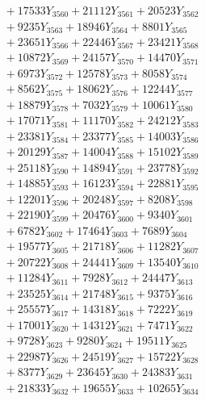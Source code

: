 \documentclass[a4paper,10pt]{article}
\begin{document}
{\begin{align}
&\;  + 17533 Y_{3560} + 21112 Y_{3561} + 20523 Y_{3562} \\[0.3ex]
&\;  + 9235 Y_{3563} + 18946 Y_{3564} + 8801 Y_{3565} \\[0.3ex]
&\;  + 23651 Y_{3566} + 22446 Y_{3567} + 23421 Y_{3568} \\[0.5ex]\allowbreak
&\;  + 10872 Y_{3569} + 24157 Y_{3570} + 14470 Y_{3571} \\[0.3ex]
&\;  + 6973 Y_{3572} + 12578 Y_{3573} + 8058 Y_{3574} \\[0.3ex]
&\;  + 8562 Y_{3575} + 18062 Y_{3576} + 12244 Y_{3577} \\[0.3ex]
&\;  + 18879 Y_{3578} + 7032 Y_{3579} + 10061 Y_{3580} \\[0.3ex]
&\;  + 17071 Y_{3581} + 11170 Y_{3582} + 24212 Y_{3583} \\[0.3ex]
&\;  + 23381 Y_{3584} + 23377 Y_{3585} + 14003 Y_{3586} \\[0.3ex]
&\;  + 20129 Y_{3587} + 14004 Y_{3588} + 15102 Y_{3589} \\[0.3ex]
&\;  + 25118 Y_{3590} + 14894 Y_{3591} + 23778 Y_{3592} \\[0.3ex]
&\;  + 14885 Y_{3593} + 16123 Y_{3594} + 22881 Y_{3595} \\[0.3ex]
&\;  + 12201 Y_{3596} + 20248 Y_{3597} + 8208 Y_{3598} \\[0.5ex]\allowbreak
&\;  + 22190 Y_{3599} + 20476 Y_{3600} + 9340 Y_{3601} \\[0.3ex]
&\;  + 6782 Y_{3602} + 17464 Y_{3603} + 7689 Y_{3604} \\[0.3ex]
&\;  + 19577 Y_{3605} + 21718 Y_{3606} + 11282 Y_{3607} \\[0.3ex]
&\;  + 20722 Y_{3608} + 24441 Y_{3609} + 13540 Y_{3610} \\[0.3ex]
&\;  + 11284 Y_{3611} + 7928 Y_{3612} + 24447 Y_{3613} \\[0.3ex]
&\;  + 23525 Y_{3614} + 21748 Y_{3615} + 9375 Y_{3616} \\[0.3ex]
&\;  + 25557 Y_{3617} + 14318 Y_{3618} + 7222 Y_{3619} \\[0.3ex]
&\;  + 17001 Y_{3620} + 14312 Y_{3621} + 7471 Y_{3622} \\[0.3ex]
&\;  + 9728 Y_{3623} + 9280 Y_{3624} + 19511 Y_{3625} \\[0.3ex]
&\;  + 22987 Y_{3626} + 24519 Y_{3627} + 15722 Y_{3628} \\[0.5ex]\allowbreak
&\;  + 8377 Y_{3629} + 23645 Y_{3630} + 24383 Y_{3631} \\[0.3ex]
&\;  + 21833 Y_{3632} + 19655 Y_{3633} + 10265 Y_{3634} \\[0.3ex]

\end{align}}
\end{document}
